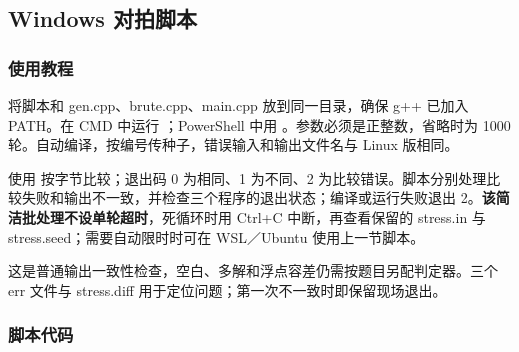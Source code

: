 \subsection{Windows 对拍脚本}
\label{other:stress-windows}
\subsubsection*{使用教程}
将脚本和 gen.cpp、brute.cpp、main.cpp 放到同一目录，确保 g++ 已加入 PATH。在 CMD 中运行 ；PowerShell 中用 。参数必须是正整数，省略时为 1000 轮。自动编译，按编号传种子，错误输入和输出文件名与 Linux 版相同。

使用  按字节比较；退出码 0 为相同、1 为不同、2 为比较错误。脚本分别处理比较失败和输出不一致，并检查三个程序的退出状态；编译或运行失败退出 2。\textbf{该简洁批处理不设单轮超时}，死循环时用 Ctrl+C 中断，再查看保留的 stress.in 与 stress.seed；需要自动限时时可在 WSL／Ubuntu 使用上一节脚本。

这是普通输出一致性检查，空白、多解和浮点容差仍需按题目另配判定器。三个 err 文件与 stress.diff 用于定位问题；第一次不一致时即保留现场退出。
\subsubsection*{脚本代码}

